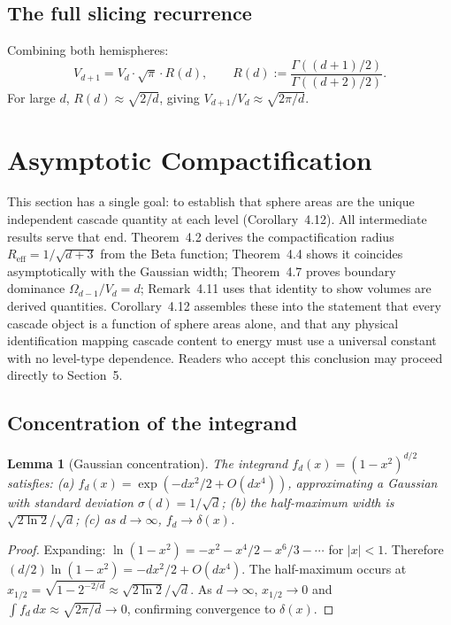 \documentclass[11pt,a4paper]{article}
\newtheorem{lemma}[theorem]{Lemma}
\begin{document}
\subsection{The full slicing recurrence}

Combining both hemispheres:
\begin{equation}
V_{d+1} = V_d\cdot\sqrt{\pi}\cdot R(d), \qquad R(d) := \frac{\Gamma((d+1)/2)}{\Gamma((d+2)/2)}.
\end{equation}
For large $d$, $R(d) \approx \sqrt{2/d}$, giving $V_{d+1}/V_d \approx \sqrt{2\pi/d}$.

\section{Asymptotic Compactification}

This section has a single goal: to establish that sphere areas are the unique independent cascade quantity at each level (Corollary~4.12). All intermediate results serve that end. Theorem~4.2 derives the compactification radius $R_\mathrm{eff} = 1/\sqrt{d+3}$ from the Beta function; Theorem~4.4 shows it coincides asymptotically with the Gaussian width; Theorem~4.7 proves boundary dominance $\Omega_{d-1}/V_d = d$; Remark~4.11 uses that identity to show volumes are derived quantities. Corollary~4.12 assembles these into the statement that every cascade object is a function of sphere areas alone, and that any physical identification mapping cascade content to energy must use a universal constant with no level-type dependence. Readers who accept this conclusion may proceed directly to Section~5.

\subsection{Concentration of the integrand}

\begin{lemma}[Gaussian concentration]
The integrand $f_d(x) = (1-x^2)^{d/2}$ satisfies:
(a) $f_d(x) = \exp(-dx^2/2 + O(dx^4))$, approximating a Gaussian with standard deviation
$\sigma(d) = 1/\sqrt{d}$; (b) the half-maximum width is $\sqrt{2\ln 2}/\sqrt{d}$; (c) as $d\to\infty$, $f_d\to\delta(x)$.
\end{lemma}

\begin{proof}
Expanding: $\ln(1-x^2) = -x^2 - x^4/2 - x^6/3 - \cdots$ for $|x|<1$. Therefore $(d/2)\ln(1-x^2) = -dx^2/2 + O(dx^4)$. The half-maximum occurs at $x_{1/2} = \sqrt{1-2^{-2/d}} \approx \sqrt{2\ln 2}/\sqrt{d}$.
As $d\to\infty$, $x_{1/2}\to 0$ and $\int f_d\,dx \approx \sqrt{2\pi/d}\to 0$, confirming convergence to $\delta(x)$.
\end{proof}
\end{document}
